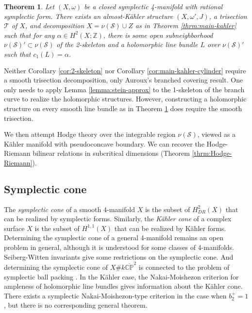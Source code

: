 \documentclass[11pt]{amsart}
\newtheorem{theorem}{Theorem}[section]
\theoremstyle{definition}
\theoremstyle{remark}
\numberwithin{equation}{section}
\newcommand{\ZZ}{\mathbb{Z}}
\newcommand{\cT}{\mathcal{T}}
\newcommand{\cS}{\mathcal{S}}
\newcommand{\CP}{\mathbb{CP}}
\begin{document}
\begin{theorem}
\label{thrm:all-line-bundles}
Let $(X,\omega)$ be a closed symplectic 4-manifold with rational symplectic form.  There exists an almost-K\"ahler structure $(X,\omega',J)$, a trisection $\cT$ of $X$, and decomposition $X = \nu(\cS) \cup Z$ as in Theorem \ref{thrm:main-kahler} such that for any $\alpha \in H^2(X;\ZZ)$, there is some open subneighborhood $\nu(\cS)' \subset \nu(\cS)$ of the 2-skeleton and a holomorphic line bundle $L$ over $\nu(\cS)'$ such that $c_1(L) = \alpha$.
\end{theorem}

Neither Corollary \ref{cor:2-skeleton} nor Corollary \ref{cor:main-kahler-cylinder} require a smooth trisection decomposition, only Auroux's branched covering result.  One only needs to apply Lemma \ref{lemma:stein-approx} to the 1-skeleton of the branch curve to realize the holomorphic structures.  However, constructing a holomorphic structure on every smooth line bundle as in Theorem \ref{thrm:all-line-bundles} does require the smooth trisection.

We then attempt Hodge theory over the integrable region $\nu(\cS)$, viewed as a K\"ahler manifold with pseudoconcave boundary.  We can recover the Hodge-Riemann bilinear relations in subcritical dimensions (Theorem \ref{thrm:Hodge-Riemann}).

\subsection{Symplectic cone}

The {\it symplectic cone} of a smooth 4-manifold $X$ is the subset of $H^2_{DR}(X)$ that can be realized by symplectic forms.  Similarly, the {\it K\"ahler cone} of a complex surface $X$ is the subset of $H^{1,1}(X)$ that can be realized by K\"ahler forms.  Determining the symplectic cone of a general 4-manifold remains an open problem in general, although it is understood for some classes of 4-manifolds.  Seiberg-Witten invariants give some restrictions on the symplectic cone.  And determining the symplectic cone of $X \# k \overline{\CP}^2$ is connected to the problem of symplectic ball packing \cite{Biran-packing}.  In the K\"ahler case, the Nakai-Moishezon criterion for ampleness of holomorphic line bundles gives information about the K\"ahler cone.  There exists a symplectic Nakai-Moishezon-type criterion in the case when $b_2^+ = 1$ \cite{Biran-thesis,Biran-packing,Li-Liu}, but there is no corresponding general theorem. 
\end{document}
